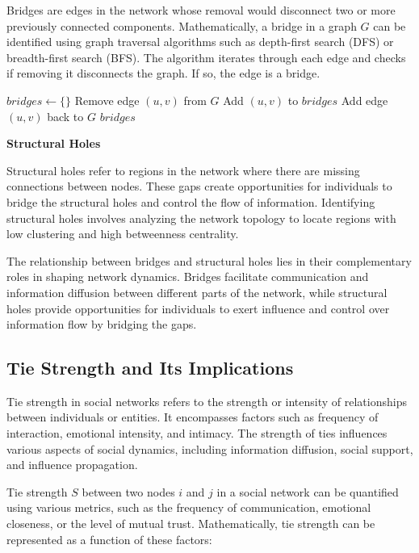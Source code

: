 \documentclass[12pt]{book} %
\begin{document}
Bridges are edges in the network whose removal would disconnect two or more previously connected components. Mathematically, a bridge in a graph \(G\) can be identified using graph traversal algorithms such as depth-first search (DFS) or breadth-first search (BFS). The algorithm iterates through each edge and checks if removing it disconnects the graph. If so, the edge is a bridge.
\FloatBarrier
\begin{algorithm}[H]
\caption{Bridge Detection Algorithm}
\begin{algorithmic}[1]
    \State $bridges \gets \{\}$
        \State Remove edge $(u, v)$ from $G$
            \State Add $(u, v)$ to $bridges$
        \EndIf
        \State Add edge $(u, v)$ back to $G$
    \EndFor
    \State \Return $bridges$
\EndFunction
\end{algorithmic}
\end{algorithm}
\FloatBarrier

\textbf{Structural Holes}

Structural holes refer to regions in the network where there are missing connections between nodes. These gaps create opportunities for individuals to bridge the structural holes and control the flow of information. Identifying structural holes involves analyzing the network topology to locate regions with low clustering and high betweenness centrality.

The relationship between bridges and structural holes lies in their complementary roles in shaping network dynamics. Bridges facilitate communication and information diffusion between different parts of the network, while structural holes provide opportunities for individuals to exert influence and control over information flow by bridging the gaps.

\subsection{Tie Strength and Its Implications}

Tie strength in social networks refers to the strength or intensity of relationships between individuals or entities. It encompasses factors such as frequency of interaction, emotional intensity, and intimacy. The strength of ties influences various aspects of social dynamics, including information diffusion, social support, and influence propagation.

Tie strength \(S\) between two nodes \(i\) and \(j\) in a social network can be quantified using various metrics, such as the frequency of communication, emotional closeness, or the level of mutual trust. Mathematically, tie strength can be represented as a function of these factors:
\end{document}
